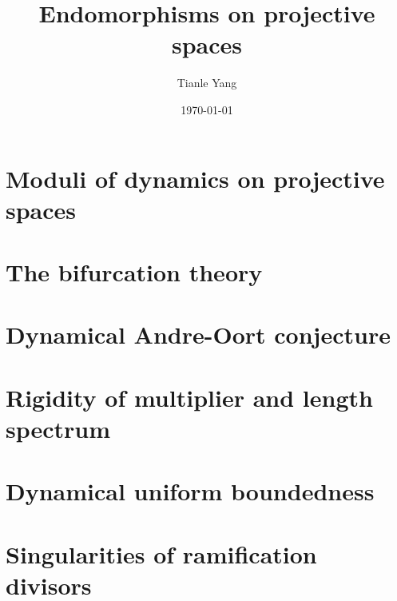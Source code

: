 \documentclass[sectionlevel=chapter,status=draft]{noteformyself}
\title{Endomorphisms on projective spaces}
\author{Tianle Yang}
\date{\today}
\begin{document}
    \maketitle

    \tableofcontents

    \section[
      status=draft,
      tag=00000,
      label=\labelNFM{sec:endomorphisms-on-projective-spaces:moduli-of-dynamics-on-projective-spaces}
    ]{Moduli of dynamics on projective spaces}
    
    \section[
      status=draft,
      tag=00000,
      label=\labelNFM{sec:endomorphisms-on-projective-spaces:the-bifurcation-theory}
    ]{The bifurcation theory}
    
    \section[
      status=draft,
      tag=00000,
      label=\labelNFM{sec:endomorphisms-on-projective-spaces:dynamical-andre-oort-conjecture}
    ]{Dynamical Andre-Oort conjecture}
    
    \section[
      status=draft,
      tag=00000,
      label=\labelNFM{sec:endomorphisms-on-projective-spaces:rigidity-of-multiplier-and-length-spectrum}
    ]{Rigidity of multiplier and length spectrum}
    
    \section[
      status=draft,
      tag=00000,
      label=\labelNFM{sec:endomorphisms-on-projective-spaces:dynamical-uniform-boundedness}
    ]{Dynamical uniform boundedness}
    
    \section[
      status=draft,
      tag=00000,
      label=\labelNFM{sec:endomorphisms-on-projective-spaces:singularities-of-ramification-divisors}
    ]{Singularities of ramification divisors}
    

    \printbibliography[heading=bibintoc, title={References}]
\end{document}
